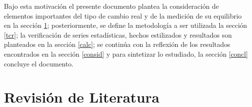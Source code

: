 \documentclass[12pt,letterpaper]{article}
\begin{document}

Bajo esta motivación el presente documento plantea la consideración de elementos importantes del tipo de cambio real y de la medición de su equilibrio en la sección \ref{pre}; posteriormente, se define la metodología a ser utilizada la sección \ref{tcr}; la verificación de series estadísticas, hechos estilizados y resultados son planteados en la sección \ref{calc}; se continúa con la reflexión de los resultados encontrados en la sección \ref{consid} y para sintetizar lo estudiado, la sección \ref{concl} concluye el documento.



\section{Revisión de Literatura}\label{pre}
\end{document}
